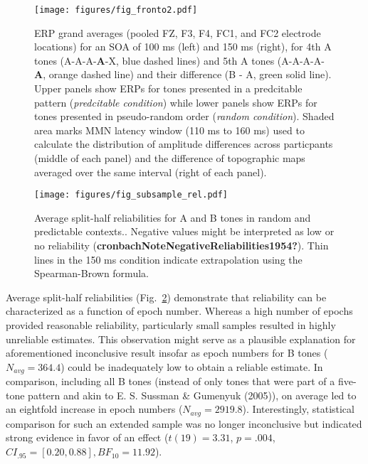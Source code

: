 \documentclass[twoside, man, a4paper,12pt, nofontenc]{apa7}
\begin{document}
\begin{figure}
\hypertarget{fig:fronto2}{%
\centering
\texttt{[image: figures/fig\_fronto2.pdf]}
\caption{ERP grand averages (pooled FZ, F3, F4, FC1, and FC2 electrode
locations) for an SOA of 100 ms (left) and 150 ms (right), for 4th A
tones (A-A-A-\textbf{A}-X, blue dashed lines) and 5th A tones
(A-A-A-A-\textbf{A}, orange dashed line) and their difference (B - A,
green solid line). Upper panels show ERPs for tones presented in a
predcitable pattern (\emph{predcitable condition}) while lower panels
show ERPs for tones presented in pseudo-random order (\emph{random
condition}). Shaded area marks MMN latency window (110 ms to 160 ms)
used to calculate the distribution of amplitude differences across
particpants (middle of each panel) and the difference of topographic
maps averaged over the same interval (right of each
panel).}\label{fig:fronto2}
}
\end{figure}



\begin{figure}
\hypertarget{fig:rel}{%
\centering
\texttt{[image: figures/fig\_subsample\_rel.pdf]}
\caption{Average split-half reliabilities for A and B tones in random
and predictable contexts.. Negative values might be interpreted as low
or no reliability (\textbf{cronbachNoteNegativeReliabilities1954?}).
Thin lines in the 150 ms condition indicate extrapolation using the
Spearman-Brown formula.}\label{fig:rel}
}
\end{figure}

Average split-half reliabilities (Fig.~\ref{fig:rel}) demonstrate that
reliability can be characterized as a function of epoch number. Whereas
a high number of epochs provided reasonable reliability, particularly
small samples resulted in highly unreliable estimates. This observation
might serve as a plausible explanation for aforementioned inconclusive
result insofar as epoch numbers for B tones (\(N_{avg} = 364.4\)) could
be inadequately low to obtain a reliable estimate. In comparison,
including all B tones (instead of only tones that were part of a
five-tone pattern and akin to E. S. Sussman \& Gumenyuk (2005)), on
average led to an eightfold increase in epoch numbers
(\(N_{avg} = 2919.8\)). Interestingly, statistical comparison for such
an extended sample was no longer inconclusive but indicated strong
evidence in favor of an effect (\(t(19) = 3.31\), \(p = .004\),
\(CI_{.95} = [0.20,0.88], BF_{10} = 11.92\)).

\newpage
\end{document}
